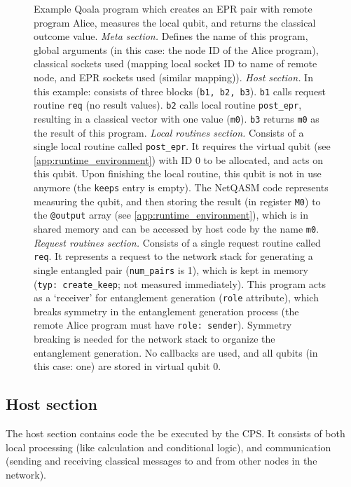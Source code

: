 \begin{figure}[t]
    \centering
    \begin{minipage}{\textwidth}
        
    \end{minipage}
    \caption{Example Qoala program which creates an EPR pair with remote program Alice, measures the local qubit, and returns the classical outcome value.
    \textit{Meta section.} Defines the name of this program, global arguments (in this case: the node ID of the Alice program),
    classical sockets used (mapping local socket ID to name of remote node, and EPR sockets used (similar mapping)).
    \textit{Host section.} In this example: consists of three blocks (\texttt{b1, b2, b3}). \texttt{b1} calls request routine \texttt{req} (no result values).
    \texttt{b2} calls local routine \texttt{post\_epr}, resulting in a classical vector with one value (\texttt{m0}).
    \texttt{b3} returns \texttt{m0} as the result of this program.
    \textit{Local routines section.} Consists of a single local routine called \texttt{post\_epr}.
    It requires the virtual qubit (see \cref{app:runtime_environment}) with ID 0 to be allocated, and acts on this qubit.
    Upon finishing the local routine, this qubit is not in use anymore (the \texttt{keeps} entry is empty).
    The NetQASM code represents measuring the qubit, and then storing the result (in register \texttt{M0}) to the \texttt{@output} array (see \cref{app:runtime_environment}), which is in shared memory and can be accessed by host code by the name \texttt{m0}.
    \textit{Request routines section.} Consists of a single request routine called \texttt{req}.
    It represents a request to the network stack for generating a single entangled pair (\texttt{num\_pairs} is 1), which is kept in memory (\texttt{typ: create\_keep}; not measured immediately).
    This program acts as a `receiver' for entanglement generation (\texttt{role} attribute), which breaks symmetry in the entanglement generation process (the remote Alice program must have \texttt{role: sender}). Symmetry breaking is needed for the network stack to organize the entanglement generation.
    No callbacks are used, and all qubits (in this case: one) are stored in virtual qubit 0.
    }
    \label{fig:app:example_full_program}
\end{figure}

\subsection{Host section}
The host section contains code the be executed by the CPS.
It consists of both local processing (like calculation and conditional logic), and
communication (sending and receiving classical messages to and from other nodes in the network).

